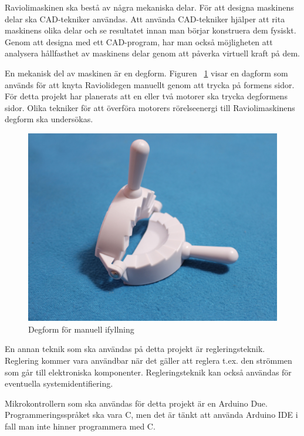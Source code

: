 Raviolimaskinen ska bestå av några mekaniska delar. För att designa maskinens delar ska CAD-tekniker användas. Att använda CAD-tekniker hjälper att rita maskinens olika delar och se resultatet innan man börjar konstruera dem fysiskt. Genom att designa med ett CAD-program, har man också möjligheten att analysera hållfasthet av maskinens delar genom att påverka virtuell kraft på dem. 


En mekanisk del av maskinen är en degform. Figuren ~\ref{degfrom} visar en dagform som används för att knyta Raviolidegen manuellt genom att trycka på formens sidor. För detta projekt har planerats att en eller två motorer ska trycka degformens sidor. Olika tekniker för att överföra motorers rörelseenergi till Raviolimaskinens degform ska undersökas. 

\begin{figure}[h]
	\begin{center}
		\includegraphics[scale=0.08] {images/degform.jpg}
		\caption{Degform för manuell ifyllning}
		\label{degfrom}	
	\end{center}
\end{figure}

En annan teknik som ska användas på detta projekt är regleringsteknik. Reglering kommer vara användbar när det gäller att reglera t.ex. den strömmen som går till elektroniska komponenter. Regleringsteknik kan också användas för eventuella systemidentifiering. 

Mikrokontrollern som ska användas för detta projekt är en Arduino Due. Programmeringsspråket ska vara C, men det är tänkt att använda Arduino IDE i fall man inte hinner programmera med C.




